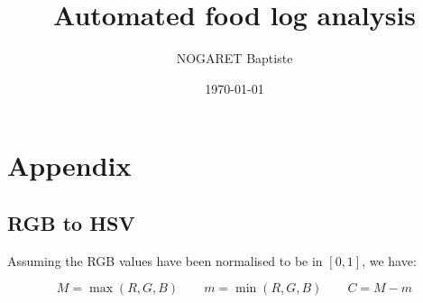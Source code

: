 \documentclass[12pt]{book}
\title{Automated food log analysis}
\author{NOGARET Baptiste}
\date{\today}
\begin{document}
\frontmatter

\maketitle





\sstableofcontents

\sslistoffigures

\sslistoftables





%
%
\mainmatter



















%
%
\appendix

\chapter{Appendix}

\section{RGB to HSV}

Assuming the RGB values have been normalised to be in $[0, 1]$, we have:

\begin{equation*}
    M = \max (R, G, B)
    \qquad
    m = \min (R, G, B)
    \qquad
    C = M - m
\end{equation*}
\end{document}
